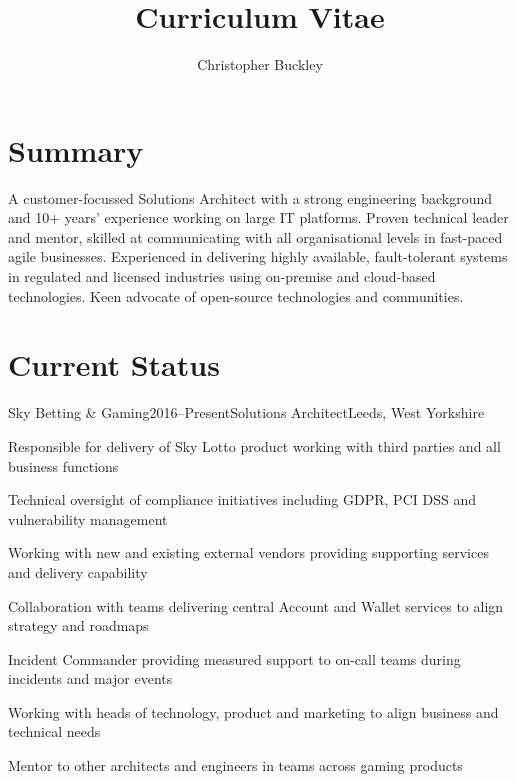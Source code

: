 \documentclass{cv}
\title{Curriculum Vitae}
\author{Christopher Buckley}
\begin{document}

\section{Summary}

A customer-focussed Solutions Architect with a strong engineering background and 10+ years'
experience working on large IT platforms. Proven technical leader and mentor, skilled at
communicating with all organisational levels in fast-paced agile businesses. Experienced in
delivering highly available, fault-tolerant systems in regulated and licensed industries using
on-premise and cloud-based technologies. Keen advocate of open-source technologies and communities.


\section{Current Status}

\begin{experience}{Sky Betting \& Gaming}{2016--Present}{Solutions Architect}{Leeds, West Yorkshire}
\item Responsible for delivery of Sky Lotto product working with third parties and all business functions
\item Technical oversight of compliance initiatives including GDPR, PCI DSS and vulnerability management
\item Working with new and existing external vendors providing supporting services and delivery capability
\item Collaboration with teams delivering central Account and Wallet services to align strategy and roadmaps
\item Incident Commander providing measured support to on-call teams during incidents and major events
\item Working with heads of technology, product and marketing to align business and technical needs
\item Mentor to other architects and engineers in teams across gaming products
\end{experience}
\end{document}
